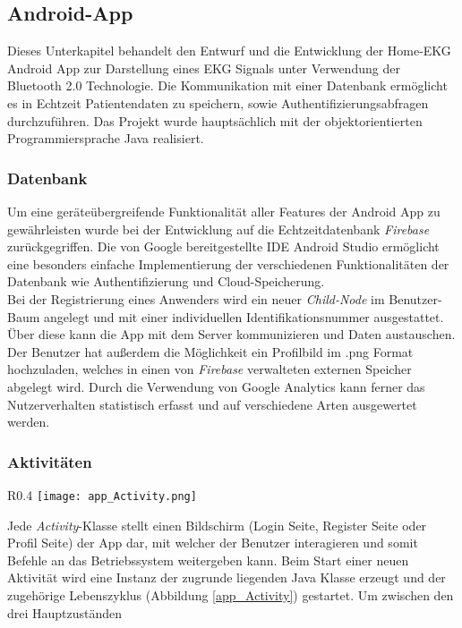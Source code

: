 \subsection{Android-App}
Dieses Unterkapitel behandelt den Entwurf und die Entwicklung der Home-EKG Android App zur Darstellung eines EKG Signals unter Verwendung der Bluetooth 2.0 Technologie. Die Kommunikation mit einer Datenbank ermöglicht es in Echtzeit Patientendaten zu speichern, sowie Authentifizierungsabfragen durchzuführen. Das Projekt wurde hauptsächlich mit der objektorientierten Programmiersprache Java realisiert. 

\subsubsection{Datenbank}
Um eine geräteübergreifende Funktionalität aller Features der Android App zu gewährleisten wurde bei der Entwicklung auf die Echtzeitdatenbank \textit{Firebase} \cite{Firebase}  zurückgegriffen. Die von Google bereitgestellte IDE Android Studio \cite{Android_Studio} ermöglicht eine besonders einfache Implementierung der verschiedenen Funktionalitäten der Datenbank wie Authentifizierung und Cloud-Speicherung. \\
Bei der Registrierung eines Anwenders wird ein neuer \textit{Child-Node} im Benutzer-Baum angelegt und mit einer individuellen Identifikationsnummer ausgestattet. Über diese kann die App mit dem Server kommunizieren und Daten austauschen. \\
Der Benutzer hat außerdem die Möglichkeit ein Profilbild im .png Format hochzuladen, welches in einen von \textit{Firebase} verwalteten externen Speicher abgelegt wird. Durch die Verwendung von Google Analytics \cite{Google_Analytics} kann ferner das Nutzerverhalten statistisch erfasst und auf verschiedene Arten ausgewertet werden. 

\subsubsection{Aktivitäten}

\begin{wrapfigure}[12]{R}{0.4\textwidth}
\vspace{-25pt}
\texttt{[image: app\_Activity.png]}
\caption{Lebenszyklus}
\label{app_Activity}
\end{wrapfigure}

Jede \textit{Activity}-Klasse \cite{Activity_Overview} stellt einen Bildschirm (Login Seite, Register Seite oder Profil Seite) der App dar, mit welcher der Benutzer interagieren und somit Befehle an das Betriebssystem weitergeben kann. Beim Start einer neuen Aktivität wird eine Instanz der zugrunde liegenden Java Klasse erzeugt und der zugehörige Lebenszyklus (Abbildung \ref{app_Activity}) gestartet. \cite{Activity_Lifecycle}
Um zwischen den drei Hauptzuständen

